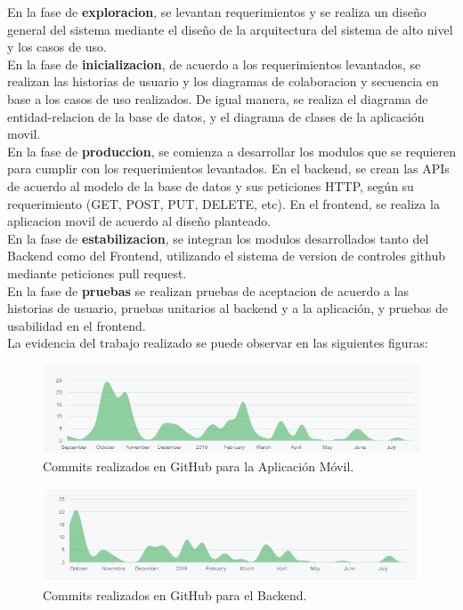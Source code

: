 \documentclass[12pt,letterpaper,openany]{book}
\begin{document}
En la fase de \textbf{exploracion},  se levantan requerimientos y se realiza un diseño general del sistema mediante el diseño de la arquitectura del sistema de alto nivel y los casos de uso.
\\
En la fase de \textbf{inicializacion}, de acuerdo a los requerimientos levantados, se realizan las historias de usuario y los diagramas de colaboracion y secuencia en base a los casos de uso realizados. De igual manera, se realiza el diagrama de entidad-relacion de la base de datos, y el diagrama de clases de la aplicación movil.
\\
En la fase de \textbf{produccion}, se comienza a desarrollar los modulos que se requieren para cumplir con los requerimientos levantados. En el backend, se crean las APIs de acuerdo al modelo de la base de datos y sus peticiones HTTP, según su requerimiento (GET, POST, PUT, DELETE, etc). En el frontend, se realiza la aplicacion movil de acuerdo al diseño planteado.
\\
En la fase de \textbf{estabilizacion}, se integran los modulos desarrollados tanto del Backend como del Frontend, utilizando el sistema de version de controles github mediante peticiones pull request.
\\
En la fase de \textbf{pruebas} se realizan pruebas de aceptacion de acuerdo a las historias de usuario, pruebas unitarios al backend y a la aplicación, y pruebas de usabilidad en el frontend.
\\
La evidencia del trabajo realizado se puede observar en las siguientes figuras:
\begin{figure}[H]
\begin{center}
\includegraphics[width=13cm]{./imagenes/commitsApp}
\caption{Commits realizados en GitHub para la Aplicación Móvil.}
\end{center}
\end{figure}

\begin{figure}[H]
\begin{center}
\includegraphics[width=13cm]{./imagenes/commitsBackend}
\caption{Commits realizados en GitHub para el Backend.}
\end{center}
\end{figure}
\end{document}
